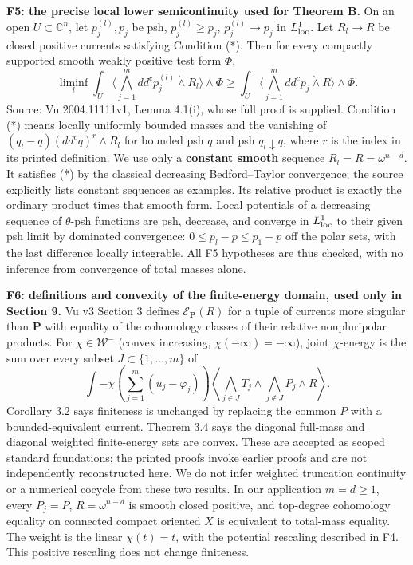 \documentclass[
  10pt,
]{article}
\begin{document}
\textbf{F5: the precise local lower semicontinuity used for Theorem B.}
On an open \(U\subset\mathbb{C}^n\), let \(p_j^{(l)},p_j\) be psh,
\(p_j^{(l)}\geq p_j\), \(p_j^{(l)}\to p_j\) in \(L^1_{\rm loc}\). Let
\(R_l\to R\) be closed positive currents satisfying Condition (*).
Then for every compactly supported smooth weakly positive test form
\(\Phi\), \[
\liminf_l\int_U\langle\bigwedge_{j=1}^m dd^cp_j^{(l)}\mathbin{\dot\wedge}R_l\rangle\wedge\Phi
\geq\int_U\langle\bigwedge_{j=1}^m dd^cp_j\mathbin{\dot\wedge}R\rangle\wedge\Phi.
\] Source: Vu 2004.11111v1, Lemma 4.1(i), whose full proof is supplied.
Condition (*) means locally uniformly bounded masses and the vanishing
of \((q_l-q)(dd^cq)^r\wedge R_l\) for bounded psh \(q\) and psh
\(q_l\downarrow q\), where \(r\) is the index in its printed definition.
We use only a \textbf{constant smooth} sequence \(R_l=R=\omega^{n-d}\).
It satisfies (*) by the classical decreasing Bedford--Taylor
convergence; the source explicitly lists constant sequences as examples.
Its relative product is exactly the ordinary product times that smooth
form. Local potentials of a decreasing sequence of \(\theta\)-psh
functions are psh, decrease, and converge in \(L^1_{\rm loc}\) to their
given psh limit by dominated convergence: \(0\leq p_l-p\leq p_1-p\) off
the polar sets, with the last difference locally integrable. All F5
hypotheses are thus checked, with no inference from convergence of total
masses alone.

\textbf{F6: definitions and convexity of the finite-energy domain, used
only in Section 9.} Vu v3 Section 3 defines
\(\mathcal{E}_{\mathbf{P}}(R)\) for a tuple of currents more singular than
\(\mathbf{P}\) with equality of the cohomology classes of their relative
nonpluripolar products. For \(\chi\in\mathcal{W}^-\) (convex increasing,
\(\chi(-\infty)=-\infty\)), joint \(\chi\)-energy is the sum over every
subset \(J\subset\{1,\ldots,m\}\) of \[
\int -\chi\!\left(\sum_{j=1}^m(u_j-\varphi_j)\right)
\left\langle\bigwedge_{j\in J}T_j\wedge\bigwedge_{j\notin J}P_j\mathbin{\dot\wedge}R\right\rangle.
\] Corollary 3.2 says finiteness is unchanged by replacing the common
\(P\) with a bounded-equivalent current. Theorem 3.4 says the diagonal
full-mass and diagonal weighted finite-energy sets are convex. These are
accepted as scoped standard foundations; the printed proofs invoke
earlier proofs and are not independently reconstructed here. We do not
infer weighted truncation continuity or a numerical cocycle from these
two results. In our application \(m=d\geq1\), every \(P_j=P\),
\(R=\omega^{n-d}\) is smooth closed positive, and top-degree cohomology
equality on connected compact oriented \(X\) is equivalent to total-mass
equality. The weight is the linear \(\chi(t)=t\), with the potential
rescaling described in F4. This positive rescaling does not change
finiteness.
\end{document}

